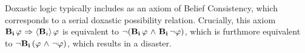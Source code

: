 %
%
%
%
%
Doxastic logic typically includes as an axiom of Belief Consistency, which corresponds to a serial doxastic possibility relation. Crucially, this axiom $\mathbf{B}_{\mathbf{i}}\,\varphi{\ \Rightarrow \ }\langle \mathbf{B}_{i} \rangle\,\varphi$ is equivalent to ${\neg}(\mathbf{B}_{\mathbf{i}}\,\varphi {\ \wedge \ } \mathbf{B}_{\mathbf{i}}\,{\neg}\varphi)$, which is furthmore equivalent to ${\neg}\mathbf{B}_{\mathbf{i}}\,(\varphi {\ \wedge \ } {\neg} \varphi)$, which results in a disaster.

